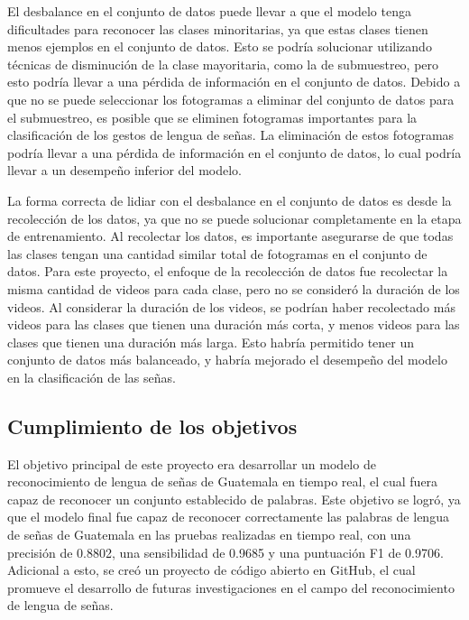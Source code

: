El desbalance en el conjunto de datos puede llevar a que el modelo tenga dificultades para reconocer las clases minoritarias, ya que estas clases tienen menos ejemplos en el conjunto de datos.
Esto se podría solucionar utilizando técnicas de disminución de la clase mayoritaria, como la de submuestreo, pero esto podría llevar a una pérdida de información en el conjunto de datos.
Debido a que no se puede seleccionar los fotogramas a eliminar del conjunto de datos para el submuestreo, es posible que se eliminen fotogramas importantes para la clasificación de los gestos de lengua de señas.
La eliminación de estos fotogramas podría llevar a una pérdida de información en el conjunto de datos, lo cual podría llevar a un desempeño inferior del modelo.

La forma correcta de lidiar con el desbalance en el conjunto de datos es desde la recolección de los datos, ya que no se puede solucionar completamente en la etapa de entrenamiento.
Al recolectar los datos, es importante asegurarse de que todas las clases tengan una cantidad similar total de fotogramas en el conjunto de datos. 
Para este proyecto, el enfoque de la recolección de datos fue recolectar la misma cantidad de videos para cada clase, pero no se consideró la duración de los videos.
Al considerar la duración de los videos, se podrían haber recolectado más videos para las clases que tienen una duración más corta, y menos videos para las clases que tienen una duración más larga.
Esto habría permitido tener un conjunto de datos más balanceado, y habría mejorado el desempeño del modelo en la clasificación de las señas.

\subsection*{Cumplimiento de los objetivos}

El objetivo principal de este proyecto era desarrollar un modelo de reconocimiento de lengua de señas de Guatemala en tiempo real, el cual fuera capaz de reconocer un conjunto establecido de palabras.
Este objetivo se logró, ya que el modelo final fue capaz de reconocer correctamente las palabras de lengua de señas de Guatemala en las pruebas realizadas en tiempo real, con una precisión de 0.8802, una sensibilidad de 0.9685 y una puntuación F1 de 0.9706.
Adicional a esto, se creó un proyecto de código abierto en GitHub, el cual promueve el desarrollo de futuras investigaciones en el campo del reconocimiento de lengua de señas.

